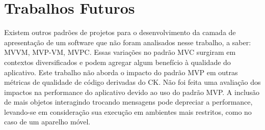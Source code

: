  
\section{Trabalhos Futuros}

Existem outros padrões de projetos para o desenvolvimento da camada de
apresentação de um software que não foram analisados nesse trabalho, a saber: 
MVVM, MVP-VM, MVPC. Essas variações no padrão MVC surgiram em contextos
diversificados e podem agregar algum benefício à qualidade do aplicativo.
Este trabalho não aborda o impacto do padrão MVP em outras métricas de qualidade
de código derivadas do CK.
Não foi feita uma avaliação dos impactos na performance do aplicativo devido ao
uso do padrão MVP. A inclusão de mais objetos interagindo trocando mensagens
pode depreciar a performance, levando-se em consideração sua execução em
ambientes mais restritos, como no caso de um aparelho móvel.